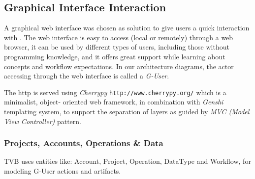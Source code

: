 \subsection{Graphical Interface Interaction}

		A graphical web interface was chosen as solution to give users a quick
		interaction with \TVB . The web interface is easy to access (local or
		remotely) through a web browser, it can be used by different types of
		users, including those without programming knowledge, and it offers
		great support while learning about \TVB concepts and workflow
		expectations.  In our architecture diagrams, the actor accessing \TVB
		through the web interface is called a \emph{G-User}.

		The http is served using \emph{Cherrypy}
		\texttt{http://www.cherrypy.org/} which is a minimalist, object-
		oriented web framework,  in combination with \emph{Genshi} templating
		system, to support the separation of layers as guided by \emph{MVC
		(Model View Controller)} pattern.

		\subsubsection{Projects, Accounts, Operations \& Data}

		TVB uses entities like: Account, Project, Operation, DataType and
		Workflow, for modeling G-User actions and artifacts.


